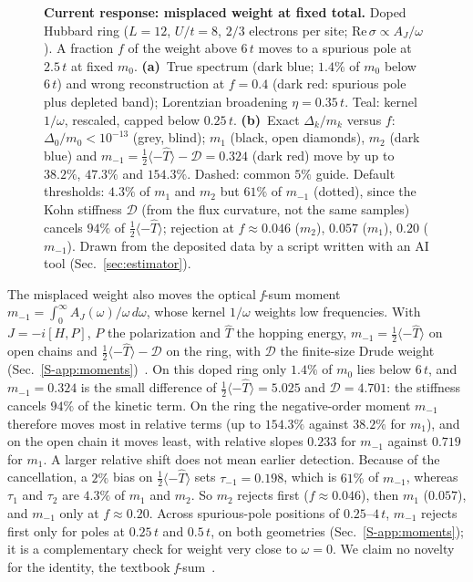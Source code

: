 \documentclass[aps,prb,reprint,onecolumn,12pt,superscriptaddress,longbibliography,floatfix]{revtex4-2}
\begin{document}
\begin{figure}[t]
\centering
{}
\caption{\textbf{Current response: misplaced weight at fixed total.} Doped Hubbard ring ($L=12$, $U/t=8$, $2/3$ electrons per site; $\mathrm{Re}\,\sigma\propto A_J/\omega$). A fraction $f$ of the weight above $6\,t$ moves to a spurious pole at $2.5\,t$ at fixed $m_0$. \textbf{(a)}~True spectrum (dark blue; $1.4\%$ of $m_0$ below $6\,t$) and wrong reconstruction at $f=0.4$ (dark red: spurious pole plus depleted band); Lorentzian broadening $\eta=0.35\,t$. Teal: kernel $1/\omega$, rescaled, capped below $0.25\,t$. \textbf{(b)}~Exact $\Delta_k/m_k$ versus $f$: $\Delta_0/m_0<10^{-13}$ (grey, blind); $m_1$ (black, open diamonds), $m_2$ (dark blue) and $m_{-1}=\tfrac12\langle-\hat T\rangle-\mathcal D=0.324$ (dark red) move by up to $38.2\%$, $47.3\%$ and $154.3\%$. Dashed: common $5\%$ guide. Default thresholds: $4.3\%$ of $m_1$ and $m_2$ but $61\%$ of $m_{-1}$ (dotted), since the Kohn stiffness $\mathcal D$ (from the flux curvature, not the same samples) cancels $94\%$ of $\tfrac12\langle-\hat T\rangle$; rejection at $f\approx0.046$ ($m_2$), $0.057$ ($m_1$), $0.20$ ($m_{-1}$). Drawn from the deposited data by a script written with an AI tool (Sec.~\ref{sec:estimator}).}
\label{fig:invfalsifier}
\end{figure}

The misplaced weight also moves the optical \textit{f}-sum moment $m_{-1}=\int_0^\infty A_J(\omega)/\omega\,d\omega$, whose kernel $1/\omega$ weights low frequencies. With $J=-i[H,P]$, $P$ the polarization and $\hat T$ the hopping energy, $m_{-1}=\tfrac12\langle-\hat T\rangle$ on open chains and $\tfrac12\langle-\hat T\rangle-\mathcal D$ on the ring, with $\mathcal D$ the finite-size Drude weight (Sec.~\ref{S-app:moments})~\cite{Kohn1964,Maldague1977}. On this doped ring only $1.4\%$ of $m_0$ lies below $6\,t$, and $m_{-1}=0.324$ is the small difference of $\tfrac12\langle-\hat T\rangle=5.025$ and $\mathcal D=4.701$: the stiffness cancels $94\%$ of the kinetic term. On the ring the negative-order moment $m_{-1}$ therefore moves most in relative terms (up to $154.3\%$ against $38.2\%$ for $m_1$), and on the open chain it moves least, with relative slopes $0.233$ for $m_{-1}$ against $0.719$ for $m_1$. A larger relative shift does not mean earlier detection. Because of the cancellation, a $2\%$ bias on $\tfrac12\langle-\hat T\rangle$ sets $\tau_{-1}=0.198$, which is $61\%$ of $m_{-1}$, whereas $\tau_1$ and $\tau_2$ are $4.3\%$ of $m_1$ and $m_2$. So $m_2$ rejects first ($f\approx0.046$), then $m_1$ ($0.057$), and $m_{-1}$ only at $f\approx0.20$. Across spurious-pole positions of $0.25$--$4\,t$, $m_{-1}$ rejects first only for poles at $0.25\,t$ and $0.5\,t$, on both geometries (Sec.~\ref{S-app:moments}); it is a complementary check for weight very close to $\omega=0$. We claim no novelty for the identity, the textbook \textit{f}-sum~\cite{Kohn1964,Maldague1977}.
\end{document}

